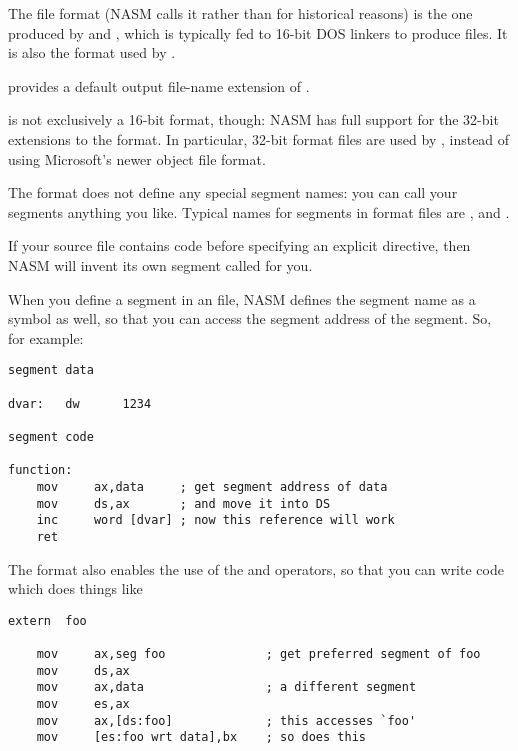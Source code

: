 The  file format (NASM calls it  rather than
 for historical reasons) is the one produced by 
and , which is typically fed to 16-bit DOS linkers
to produce  files. It is also the format used by
.

 provides a default output file-name extension of .

 is not exclusively a 16-bit format, though: NASM has full
support for the 32-bit extensions to the format. In particular,
32-bit  format files are used by , instead of using Microsoft's newer  object
file format.

The  format does not define any special segment names: you
can call your segments anything you like. Typical names for segments
in  format files are ,  and .

If your source file contains code before specifying an explicit
 directive, then NASM will invent its own segment called
 for you.

When you define a segment in an  file, NASM defines the
segment name as a symbol as well, so that you can access the segment
address of the segment. So, for example:

\begin{lstlisting}
segment data

dvar:   dw      1234

segment code

function:
    mov     ax,data     ; get segment address of data
    mov     ds,ax       ; and move it into DS
    inc     word [dvar] ; now this reference will work
    ret
\end{lstlisting}

The  format also enables the use of the 
and  operators, so that you can write code which
does things like

\begin{lstlisting}
extern  foo

    mov     ax,seg foo              ; get preferred segment of foo
    mov     ds,ax
    mov     ax,data                 ; a different segment
    mov     es,ax
    mov     ax,[ds:foo]             ; this accesses `foo'
    mov     [es:foo wrt data],bx    ; so does this
\end{lstlisting}

